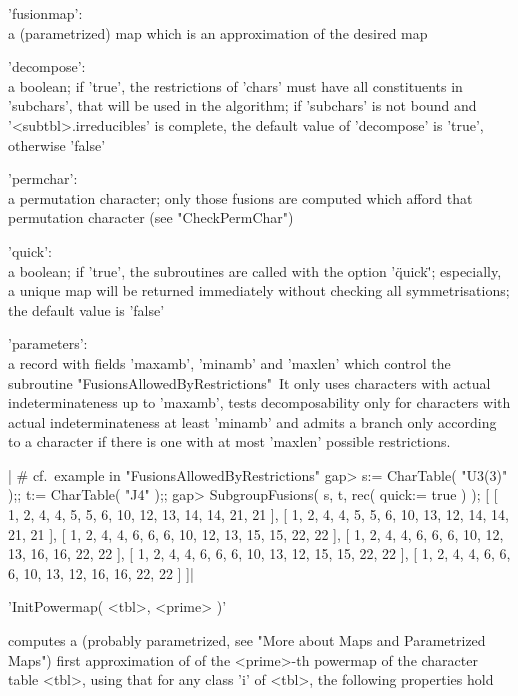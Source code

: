 'fusionmap':\\
     a (parametrized) map which is an approximation of the desired map

'decompose':\\
     a boolean; if 'true', the restrictions of 'chars' must have all
     constituents in 'subchars', that will be used in the algorithm;
     if 'subchars' is not bound and '<subtbl>.irreducibles' is complete,
     the default value of 'decompose' is 'true', otherwise 'false'

'permchar':\\
     a permutation character; only those fusions are computed which
     afford that permutation character (see "CheckPermChar")

'quick':\\
     a boolean; if 'true', the subroutines are called with the option
     '\"quick\"'; especially, a unique map will be returned immediately
     without checking all symmetrisations; the default value is 'false'

'parameters':\\
     a record with fields 'maxamb', 'minamb' and 'maxlen' which control
     the subroutine "FusionsAllowedByRestrictions"\:\ 
     It only uses characters with actual indeterminateness up to
     'maxamb', tests decomposability only for characters with actual
     indeterminateness at least 'minamb' and admits a branch only
     according to a character if there is one with at most 'maxlen'
     possible restrictions.

|    # cf.\ example in "FusionsAllowedByRestrictions"
    gap> s:= CharTable( "U3(3)" );; t:= CharTable( "J4" );;
    gap> SubgroupFusions( s, t, rec( quick:= true ) );
    [ [ 1, 2, 4, 4, 5, 5, 6, 10, 12, 13, 14, 14, 21, 21 ],
      [ 1, 2, 4, 4, 5, 5, 6, 10, 13, 12, 14, 14, 21, 21 ],
      [ 1, 2, 4, 4, 6, 6, 6, 10, 12, 13, 15, 15, 22, 22 ],
      [ 1, 2, 4, 4, 6, 6, 6, 10, 12, 13, 16, 16, 22, 22 ],
      [ 1, 2, 4, 4, 6, 6, 6, 10, 13, 12, 15, 15, 22, 22 ],
      [ 1, 2, 4, 4, 6, 6, 6, 10, 13, 12, 16, 16, 22, 22 ] ]|

\Section{InitPowermap}\index{powermaps}

'InitPowermap( <tbl>, <prime> )'

computes a (probably parametrized,
see "More about Maps and Parametrized Maps") first
approximation of of the <prime>-th powermap of the character table <tbl>,
using that for any class 'i' of <tbl>, the following properties hold\:

